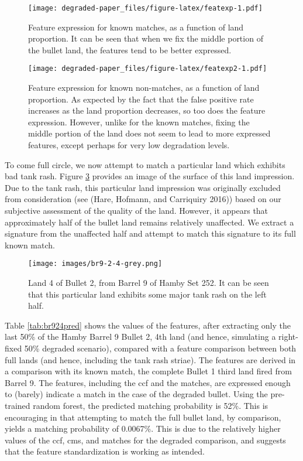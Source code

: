 \documentclass[12pt,]{article}
\theoremstyle{definition}
\theoremstyle{definition}
\theoremstyle{definition}
\theoremstyle{remark}
\begin{document}
\begin{figure}[htbp]
\centering
\texttt{[image: degraded-paper\_files/figure-latex/featexp-1.pdf]}
\caption{\label{fig:featexp}Feature expression for known matches, as a
function of land proportion. It can be seen that when we fix the middle
portion of the bullet land, the features tend to be better expressed.}
\end{figure}

\begin{figure}[htbp]
\centering
\texttt{[image: degraded-paper\_files/figure-latex/featexp2-1.pdf]}
\caption{\label{fig:featexp2}Feature expression for known non-matches, as a
function of land proportion. As expected by the fact that the false
positive rate increases as the land proportion decreases, so too does
the feature expression. However, unlike for the known matches, fixing
the middle portion of the land does not seem to lead to more expressed
features, except perhaps for very low degradation levels.}
\end{figure}

To come full circle, we now attempt to match a particular land which
exhibits bad tank rash. Figure \ref{fig:br924} provides an image of the
surface of this land impression. Due to the tank rash, this particular
land impression was originally excluded from consideration (see (Hare,
Hofmann, and Carriquiry 2016)) based on our subjective assessment of the
quality of the land. However, it appears that approximately half of the
bullet land remains relatively unaffected. We extract a signature from
the unaffected half and attempt to match this signature to its full
known match.

\begin{figure}[H]
\centering
\texttt{[image: images/br9-2-4-grey.png]}
\caption{Land 4 of Bullet 2, from Barrel 9 of Hamby Set 252. It can be seen that this particular land exhibits some major tank rash on the left half.}
\label{fig:br924}
\end{figure}

Table \ref{tab:br924pred} shows the values of the features, after
extracting only the last 50\% of the Hamby Barrel 9 Bullet 2, 4th land
(and hence, simulating a right-fixed 50\% degraded scenario), compared
with a feature comparison between both full lands (and hence, including
the tank rash striae). The features are derived in a comparison with its
known match, the complete Bullet 1 third land fired from Barrel 9. The
features, including the ccf and the matches, are expressed enough to
(barely) indicate a match in the case of the degraded bullet. Using the
pre-trained random forest, the predicted matching probability is 52\%.
This is encouraging in that attempting to match the full bullet land, by
comparison, yields a matching probability of 0.0067\%. This is due to
the relatively higher values of the ccf, cms, and matches for the
degraded comparison, and suggests that the feature standardization is
working as intended.
\end{document}
